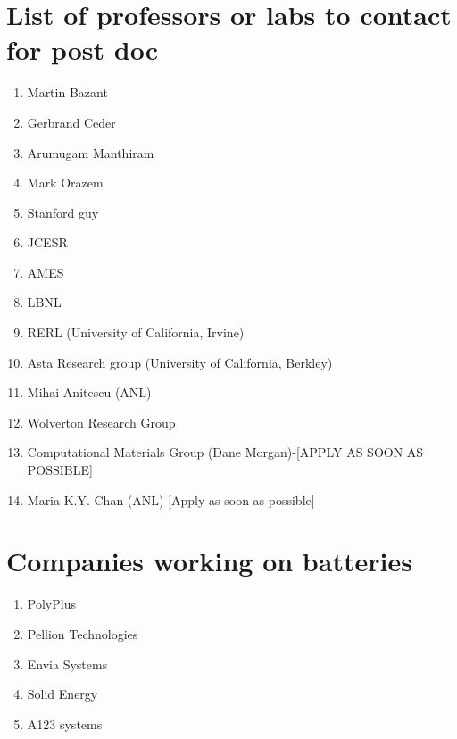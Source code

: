 \documentclass[12pt]{book}
\begin{document}
%

\newpage
\chapter{List of professors or labs to contact for post doc}
\begin{enumerate}
\item Martin Bazant
\item Gerbrand Ceder
\item Arumugam Manthiram
\item Mark Orazem
\item Stanford guy
\item JCESR
\item AMES
\item LBNL
\item RERL (University of California, Irvine)
\item Asta Research group (University of California, Berkley)
\item Mihai Anitescu (ANL)
\item Wolverton Research Group
\item Computational Materials Group (Dane Morgan)-[APPLY AS SOON AS POSSIBLE]
\item Maria K.Y. Chan (ANL) [Apply as soon as possible]
\end{enumerate}

\newpage
\chapter{Companies working on batteries}
\begin{enumerate}
\item PolyPlus
\item Pellion Technologies
\item Envia Systems
\item Solid Energy
\item A123 systems
\end{enumerate}
\newpage 
\end{document}
